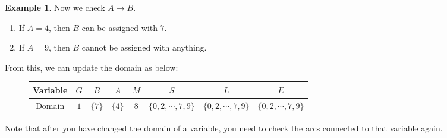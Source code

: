 \documentclass{article}
\theoremstyle{definition}
\newtheorem{example}{Example}[definition]
\begin{document}
\begin{example}
	Now we check $A\to B$.
	\begin{enumerate}
		\item If $A=4$, then $B$ can be assigned with $7$.
		\item If $A=9$, then $B$ cannot be assigned with anything.
	\end{enumerate}
	From this, we can update the domain as below:
	\begin{figure}[h]
		\centering
		\begin{tabular}{|c||c|c|c|c|c|c|c|}
			\hline
			Variable & $G$ & $B$ & $A$ & $M$ & $S$ & $L$ & $E$\\
			\hline
			Domain & $1$ & $\{7\}$ & $\{4\}$ & $8$ & $\{0,2,\cdots,7,9\}$ & $\{0,2,\cdots,7,9\}$ & $\{0,2,\cdots,7,9\}$\\
			\hline
		\end{tabular}
	\end{figure}
\end{example}
Note that after you have changed the domain of a variable, you need to check the arcs connected to that variable again.
\end{document}
